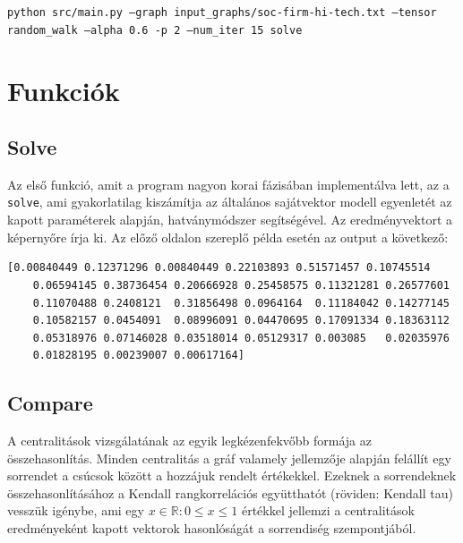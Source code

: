 \documentclass[12pt,numbers=noenddot]{report}
\begin{document}
\texttt{python src/main.py --graph input\_graphs/soc-firm-hi-tech.txt --tensor random\_walk --alpha 0.6 -p 2 --num\_iter 15 solve}



\chapter{Funkciók}


\section{Solve}

Az első funkció, amit a program nagyon korai fázisában implementálva lett, 
az a \texttt{solve}, ami gyakorlatilag kiszámítja az általános sajátvektor 
modell egyenletét az kapott paraméterek alapján, hatványmódszer segítségével.
Az eredményvektort a képernyőre írja ki. Az előző oldalon szereplő példa esetén
az output a következő:

\vspace{0.4cm}

\footnotesize
\noindent
\begin{verbatim}
[0.00840449 0.12371296 0.00840449 0.22103893 0.51571457 0.10745514
	0.06594145 0.38736454 0.20666928 0.25458575 0.11321281 0.26577601
	0.11070488 0.2408121  0.31856498 0.0964164  0.11184042 0.14277145
	0.10582157 0.0454091  0.08996091 0.04470695 0.17091334 0.18363112
	0.05318976 0.07146028 0.03518014 0.05129317 0.003085   0.02035976
	0.01828195 0.00239007 0.00617164]
\end{verbatim}
\normalsize

\section{Compare}

A centralitások vizsgálatának az egyik legkézenfekvőbb formája az 
összehasonlítás. Minden centralitás a gráf valamely jellemzője alapján
felállít egy sorrendet a csúcsok között a hozzájuk rendelt értékekkel.
Ezeknek a sorrendeknek összehasonlításához a Kendall rangkorrelációs 
együtthatót (röviden: Kendall tau) vesszük igénybe, ami egy 
$x \in \mathbb{R}: 0 \leq x \leq 1$
értékkel jellemzi a centralitások eredményeként kapott vektorok hasonlóságát
a sorrendiség szempontjából.
\end{document}
